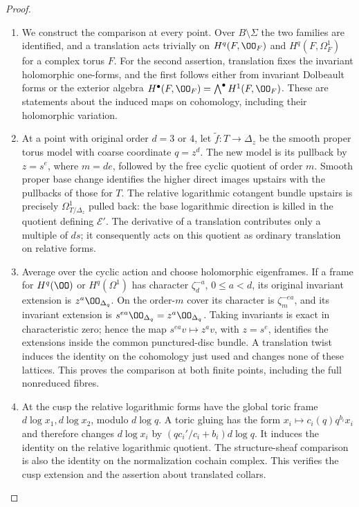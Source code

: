 \begin{proof}
\begin{enumerate}[label=\arabic*.,leftmargin=*]
\item We construct the comparison at every point. Over $B\setminus\Sigma$
the two families are identified, and a translation acts trivially on
$H^q(F,\OO_F)$ and $H^q(F,\Omega^1_F)$ for a complex torus $F$.
For the second assertion, translation fixes the invariant holomorphic
one-forms, and the first follows either from invariant Dolbeault forms
or the exterior algebra $H^\bullet(F,\OO_F)=\bigwedge^\bullet H^1(F,\OO_F)$.
These are statements about the induced maps on cohomology, including
their holomorphic variation.

\item At a point with original order $d=3$ or $4$, let
$\widetilde f:T\to\Delta_z$ be the smooth proper torus model with
coarse coordinate $q=z^d$. The new model is its pullback by $z=s^e$,
where $m=de$, followed by the free cyclic quotient of order $m$.
Smooth proper base change identifies the higher direct images upstairs
with the pullbacks of those for $T$. The relative logarithmic cotangent
bundle upstairs is precisely $\Omega^1_{T/\Delta_z}$ pulled back:
the base logarithmic direction is killed in the quotient defining $\mathcal E'$.
The derivative of a translation contributes only a multiple of $ds$;
it consequently acts on this quotient as ordinary translation on relative forms.

\item Average over the cyclic action and choose holomorphic eigenframes.
If a frame for $H^q(\OO)$ or $H^q(\Omega^1)$ has character
$\zeta_d^{-a}$, $0\le a<d$, its original invariant extension is
$z^a\OO_{\Delta_q}$. On the order-$m$ cover its character is
$\zeta_m^{-ea}$, and its invariant extension is
$s^{ea}\OO_{\Delta_q}=z^a\OO_{\Delta_q}$.
Taking invariants is exact in characteristic zero; hence the map $s^{ea}v\mapsto z^av$, with $z=s^e$,
identifies the extensions inside the common punctured-disc bundle. A translation
twist induces the identity on the cohomology just used and changes none
of these lattices. This proves the comparison at both finite points,
including the full nonreduced fibres.

\item At the cusp the relative logarithmic forms have the global toric frame
$d\log x_1,d\log x_2$, modulo $d\log q$.
A toric gluing has the form
$x_i\mapsto c_i(q)q^{b_i}x_i$ and therefore changes $d\log x_i$ by
$(q c_i'/c_i+b_i)d\log q$. It induces the identity on the relative
logarithmic quotient. The structure-sheaf comparison is also the identity
on the normalization cochain complex. This verifies the cusp extension
and the assertion about translated collars.


\end{enumerate}
\end{proof}
